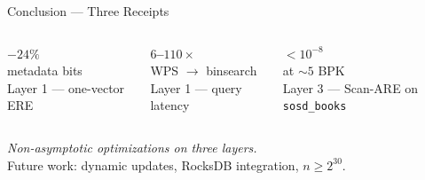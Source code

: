 \begin{frame}{Conclusion — Three Receipts}
  \begin{columns}[c,onlytextwidth]
    \centering
    {\Huge\bfseries\textcolor{thAccent1}{$-24\%$}}\\[0.4em]
    {\small metadata bits}\\
    {\footnotesize Layer 1 — one-vector ERE}

    \centering
    {\Huge\bfseries\textcolor{thAccent2}{$6$--$110\times$}}\\[0.4em]
    {\small WPS $\to$ binsearch}\\
    {\footnotesize Layer 1 — query latency}

    \centering
    {\Huge\bfseries\textcolor{thScanARE}{$<\!10^{-8}$}}\\[0.4em]
    {\small at $\sim 5$ BPK}\\
    {\footnotesize Layer 3 — Scan-ARE on \texttt{sosd\_books}}
  \end{columns}
  \vspace{1em}
  \centering
  \emph{Non-asymptotic optimizations on three layers.}\\
  \vspace{0.5em}
  {\footnotesize Future work: dynamic updates, RocksDB integration, $n \geq 2^{30}$.}
\end{frame}
